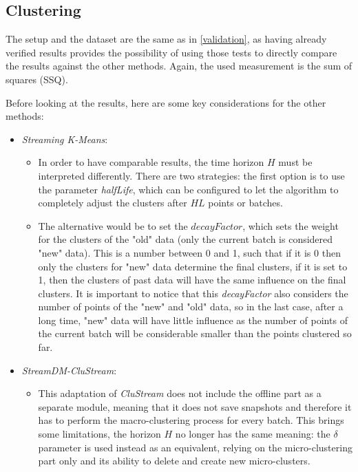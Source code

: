 \documentclass[10pt, conference, compsocconf]{IEEEtran}
\begin{document}
\subsection{Clustering}

The setup and the dataset are the same as in \ref{validation}, as having already verified results provides the possibility of using those tests to directly compare the results against the other methods. Again, the used measurement is the sum of squares (SSQ).

Before looking at the results, here are some key considerations for the other methods:

\begin{itemize}
 \item \textit{Streaming K-Means}:
 \begin{itemize}
  \item In order to have comparable results, the time horizon $H$ must be interpreted differently. There are two strategies: the first option is to use the parameter \textit{halfLife}, which can be configured to let the algorithm to completely adjust the clusters after $HL$ points or batches.
  \item The alternative would be to set the $decayFactor$, which sets the weight for the clusters of the "old" data (only the current batch is considered "new" data). This is a number between 0 and 1, such that if it is 0 then only the clusters for "new" data determine the final clusters, if it is set to 1, then the clusters of past data will have the same influence on the final clusters. It is important to notice that this \textit{decayFactor} also considers the number of points of the "new" and "old" data, so in the last case, after a long time, "new" data will have little influence as the number of points of the current batch will be considerable smaller than the points clustered so far.
 \end{itemize}
 \item \textit{StreamDM-CluStream}:
 \begin{itemize}
  \item This adaptation of \textit{CluStream} does not include the offline part as a separate module, meaning that it does not save snapshots and therefore it has to perform the macro-clustering process for every batch. This brings some limitations, the horizon $H$ no longer has the same meaning: the $\delta$ parameter is used instead as an equivalent, relying on the micro-clustering part only and its ability to delete and create new micro-clusters.
\end{itemize}

\end{itemize}
\end{document}

